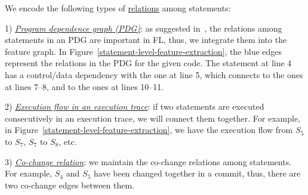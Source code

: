 We encode the following types of \underline{relations} among
statements:

1) {\em \underline{Program dependence graph (PDG)}}: as suggested
in~\cite{icse21-fl}, the relations among statements in an PDG are
important in FL, thus, we integrate them into the feature graph. In
Figure~\ref{statement-level-feature-extraction}, the blue edges
represent the relations in the PDG for the given code.  The statement
at line 4 has a control/data dependency with the one at line 5, which
connects to the ones at lines 7--8, and to the ones at lines 10--11.

2) {\em \underline{Execution flow in an execution trace}}: if two
statements are executed consecutively in an execution trace, we will
connect them together. For example, in
Figure~\ref{statement-level-feature-extraction}, we have the execution
flow from $S_5$ to $S_7$, $S_7$ to $S_8$, etc.



3) {\em \underline{Co-change relation}}: we maintain the co-change
relations among statements. For example, $S_4$ and $S_5$ have been
changed together in a commit, thus, there are two co-change edges
between them.



